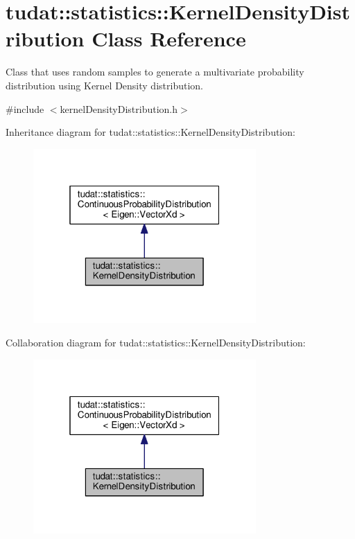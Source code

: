 \hypertarget{classtudat_1_1statistics_1_1KernelDensityDistribution}{}\section{tudat\+:\+:statistics\+:\+:Kernel\+Density\+Distribution Class Reference}
\label{classtudat_1_1statistics_1_1KernelDensityDistribution}


Class that uses random samples to generate a multivariate probability distribution using Kernel Density distribution.  




{\ttfamily \#include $<$kernel\+Density\+Distribution.\+h$>$}



Inheritance diagram for tudat\+:\+:statistics\+:\+:Kernel\+Density\+Distribution\+:
\nopagebreak
\begin{figure}[H]
\begin{center}
\leavevmode
\includegraphics[width=241pt]{classtudat_1_1statistics_1_1KernelDensityDistribution__inherit__graph}
\end{center}
\end{figure}


Collaboration diagram for tudat\+:\+:statistics\+:\+:Kernel\+Density\+Distribution\+:
\nopagebreak
\begin{figure}[H]
\begin{center}
\leavevmode
\includegraphics[width=241pt]{classtudat_1_1statistics_1_1KernelDensityDistribution__coll__graph}
\end{center}
\end{figure}
